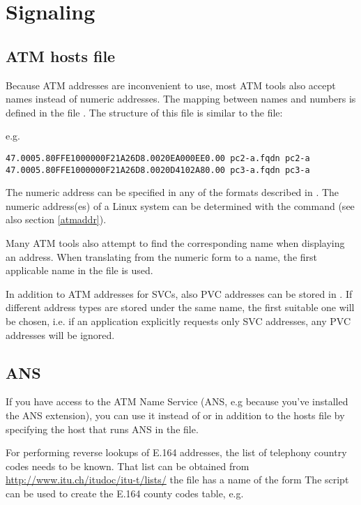 

\section{Signaling}

\subsection{ATM hosts file}
\label{hosts}

Because ATM addresses are inconvenient to use, most ATM tools also
accept names instead of numeric addresses. The mapping between names and
numbers is defined in the file . The structure of
this file is similar to the  file:

 

e.g.

\begin{verbatim}
47.0005.80FFE1000000F21A26D8.0020EA000EE0.00 pc2-a.fqdn pc2-a
47.0005.80FFE1000000F21A26D8.0020D4102A80.00 pc3-a.fqdn pc3-a
\end{verbatim}

The numeric address can be specified in any of the formats described
in \cite{api}. The numeric address(es) of a Linux system can be
determined with the command  (see also section \ref{atmaddr}).

Many ATM tools also attempt to find the corresponding name when displaying
an address. When translating from the numeric form to a name, the first
applicable name in the file is used.

In addition to ATM addresses for SVCs, also PVC addresses can be stored in
. If different address types are stored under the
same name, the first suitable one will be chosen, i.e. if an application
explicitly requests only SVC addresses, any PVC addresses will be ignored.


\subsection{ANS}

If you have access to the ATM Name Service (ANS, e.g because you've installed
the ANS extension), you can use it instead of or in addition to the hosts
file by specifying the host that runs ANS in the 
file.

For performing reverse lookups of E.164 addresses, the list of telephony
country codes needs to be known. That list can be obtained from
\url{http://www.itu.ch/itudoc/itu-t/lists/} the file has a name of the
form  The script  can
be used to create the E.164 county codes table, e.g.

